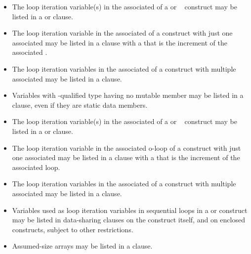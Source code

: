 \ccppspecificstart
\begin{itemize}
\item The loop iteration variable(s) in the associated  of a  or 
~ construct may be listed in a  or  clause. 

\item The loop iteration variable in the associated  of a  construct with just 
one associated  may be listed in a  clause with a  
that is the increment of the associated .

\item The loop iteration variables in the associated  of a  construct with 
multiple associated  may be listed in a  clause. 

\item Variables with -qualified type having no mutable member may be listed in a
 clause, even if they are static data members.
\end{itemize}
\ccppspecificend

\fortranspecificstart
\begin{itemize}
\item The loop iteration variable(s) in the associated  of a  or 
~ 
construct may be listed in a  or  clause. 

\item The loop iteration variable in the associated o-loop of a  construct with just 
one associated  may be listed in a  clause with a  
that is the increment of the associated loop.

\item The loop iteration variables in the associated  of a  construct with 
multiple associated  may be listed in a  clause. 

\item Variables used as loop iteration variables in sequential loops in a  or 
 construct may be listed in data-sharing clauses on the construct itself, and on 
enclosed constructs, subject to other restrictions.

\item Assumed-size arrays may be listed in a  clause.
\end{itemize}
\fortranspecificend

